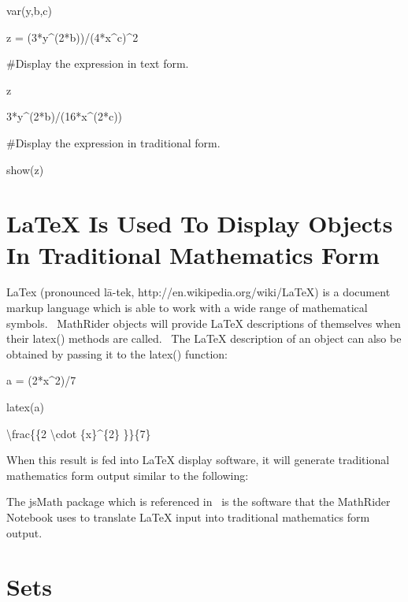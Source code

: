 \documentclass[12pt,twoside]{book}
\begin{document}
\bigskip

var({\textquotesingle}y,b,c{\textquotesingle})

z = (3*y\^{}(2*b))/(4*x\^{}c)\^{}2


\bigskip

\#Display the expression in text form.

z

{\textbar}

3*y\^{}(2*b)/(16*x\^{}(2*c))

\#Display the expression in traditional form.

show(z)

{\textbar}


\bigskip

 


\bigskip

\section[LaTeX Is Used To Display Objects In Traditional Mathematics Form]{LaTeX Is Used To Display Objects In Traditional Mathematics Form}

LaTex (pronounced l\=a{}-tek, http://en.wikipedia.org/wiki/LaTeX) is a document markup language which is able to work with a wide range of mathematical symbols. \ MathRider objects will provide LaTeX descriptions of themselves when their latex() methods are called. \ The LaTeX description of an object can also be obtained by passing it to the latex() function: 

\bigskip

a = (2*x\^{}2)/7

latex(a)

{\textbar}

{\textbackslash}frac\{\{2 {\textbackslash}cdot \{x\}\^{}\{2\} \}\}\{7\}

When this result is fed into LaTeX display software, it will generate traditional mathematics form output similar to the following: 

\bigskip


\bigskip


\bigskip

The jsMath package which is referenced in \ is the software that the MathRider Notebook uses to translate LaTeX input into traditional mathematics form output. 

\section[Sets]{Sets}
\end{document}
